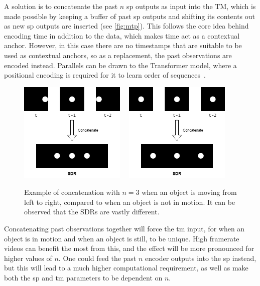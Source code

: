 A solution is to concatenate the past $n$ \gls*{sp} outputs as input into the TM, which is made possible by keeping a buffer of past \gls*{sp} outputs and shifting its contents out as new \gls*{sp} outputs are inserted (see \autoref{fig:mtp}). This follows the core idea behind encoding time in addition to the data, which makes time act as a contextual anchor. However, in this case there are no timestamps that are suitable to be used as contextual anchors, so as a replacement, the past observations are encoded instead. Parallels can be drawn to the Transformer model, where a positional encoding is required for it to learn order of sequences~\cite{transformer}.
\par
\begin{figure}[H]
    \centering
    \includegraphics[width=0.45\textwidth]{resources/methodology/temporal_concatenation.png}
    \unskip\ \vrule\
    \includegraphics[width=0.45\textwidth]{resources/methodology/temporal_concatenation_still.png}
    \caption[Multistep Temporal Pattern Example]{Example of concatenation with $n=3$ when an object is moving from left to right, compared to when an object is not in motion. It can be observed that the SDRs are vastly different.}
    \label{fig:mtp}
\end{figure}
Concatenating past observations together will force the \gls*{tm} input, for when an object is in motion and when an object is still, to be unique. High framerate videos can benefit the most from this, and the effect will be more pronounced for higher values of $n$. One could feed the past $n$ encoder outputs into the \gls*{sp} instead, but this will lead to a much higher computational requirement, as well as make both the \gls*{sp} and \gls*{tm} parameters to be dependent on $n$.

